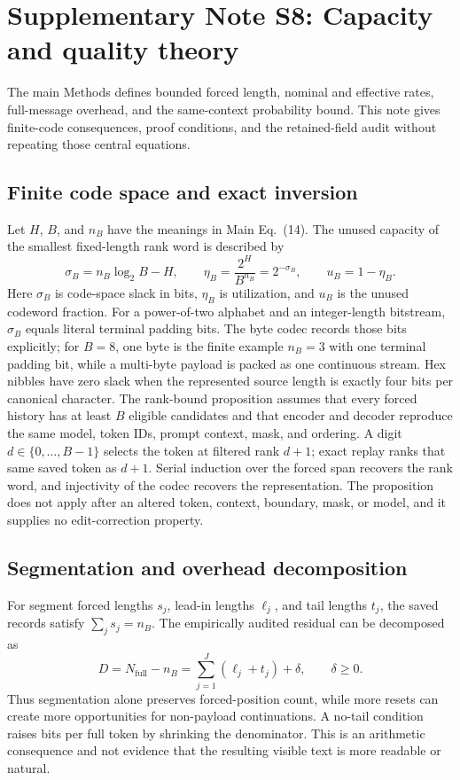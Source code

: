 \documentclass[fleqn,10pt]{wlscirep}
\begin{document}
\section*{Supplementary Note S8: Capacity and quality theory}\label{si:s8}

The main Methods defines bounded forced length, nominal and effective rates, full-message overhead, and the same-context probability bound. This note gives finite-code consequences, proof conditions, and the retained-field audit without repeating those central equations.

\subsection*{Finite code space and exact inversion}

Let \(H\), \(B\), and \(n_B\) have the meanings in Main Eq.~(14). The unused capacity of the smallest fixed-length rank word is described by
\[
\sigma_B=n_B\log_2B-H,\qquad
\eta_B=\frac{2^H}{B^{n_B}}=2^{-\sigma_B},\qquad
u_B=1-\eta_B .
\]
Here \(\sigma_B\) is code-space slack in bits, \(\eta_B\) is utilization, and \(u_B\) is the unused codeword fraction. For a power-of-two alphabet and an integer-length bitstream, \(\sigma_B\) equals literal terminal padding bits. The byte codec records those bits explicitly; for \(B=8\), one byte is the finite example \(n_B=3\) with one terminal padding bit, while a multi-byte payload is packed as one continuous stream. Hex nibbles have zero slack when the represented source length is exactly four bits per canonical character.
The rank-bound proposition assumes that every forced history has at least \(B\) eligible candidates and that encoder and decoder reproduce the same model, token IDs, prompt context, mask, and ordering. A digit \(d\in\{0,\ldots,B-1\}\) selects the token at filtered rank \(d+1\); exact replay ranks that same saved token as \(d+1\). Serial induction over the forced span recovers the rank word, and injectivity of the codec recovers the representation. The proposition does not apply after an altered token, context, boundary, mask, or model, and it supplies no edit-correction property.

\subsection*{Segmentation and overhead decomposition}

For segment forced lengths \(s_j\), lead-in lengths \(\ell_j\), and tail lengths \(t_j\), the saved records satisfy \(\sum_js_j=n_B\). The empirically audited residual can be decomposed as
\[
D=N_{\mathrm{full}}-n_B
 =\sum_{j=1}^{J}(\ell_j+t_j)+\delta,\qquad \delta\ge0 .
\]
Thus segmentation alone preserves forced-position count, while more resets can create more opportunities for non-payload continuations. A no-tail condition raises bits per full token by shrinking the denominator. This is an arithmetic consequence and not evidence that the resulting visible text is more readable or natural.
\end{document}
